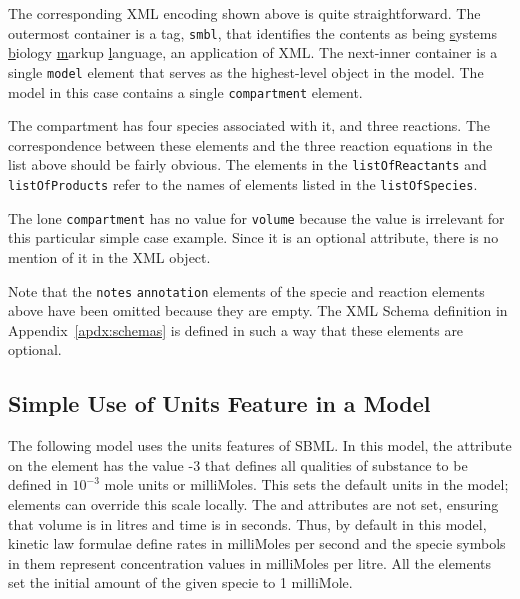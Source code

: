 \documentclass[10pt]{cek-article}
\begin{document}
The corresponding XML encoding shown above is quite straightforward. The
outermost container is a tag, \texttt{smbl}, that identifies the contents
as being \underline{s}ystems \underline{b}iology \underline{m}arkup
\underline{l}anguage, an application of XML. The next-inner container is a
single \texttt{model} element that serves as the highest-level object in
the model.  The model in this case contains a single \texttt{compartment}
element.

The compartment has four species associated with it, and three reactions.
The correspondence between these elements and the three reaction equations
in the list above should be fairly obvious.  The elements in the
\texttt{listOfReactants} and \texttt{listOfProducts} refer to the names of
elements listed in the \texttt{listOfSpecies}.

The lone \texttt{compartment} has no value for \texttt{volume} because the
value is irrelevant for this particular simple case example.  Since it is
an optional attribute, there is no mention of it in the XML object.

Note that the \texttt{notes} \texttt{annotation} elements of the specie and
reaction elements above have been omitted because they are empty.  The XML
Schema definition in Appendix~\ref{apdx:schemas} is defined in such a way
that these elements are optional.

\subsection{Simple Use of Units Feature in a Model}
\label{subsection:unitseg}

The following model uses the units features of SBML.  In this
model, the  attribute on the 
element has the value -3 that defines all qualities of substance
to be defined in $10^{-3}$ mole units or milliMoles.  This sets
the default units in the model; elements can override this scale
locally.  The  and 
attributes are not set, ensuring that volume is in litres and time
is in seconds.  Thus, by default in this model, kinetic law
formulae define rates in milliMoles per second and the specie
symbols in them represent concentration values in milliMoles per
litre.  All the  elements set the initial amount of
the given specie to 1 milliMole.
\end{document}
